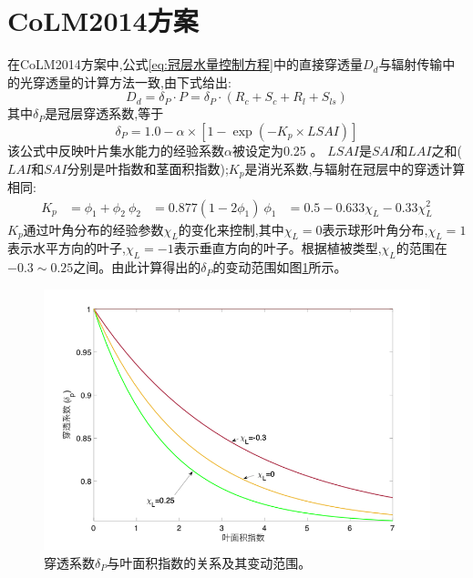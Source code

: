 \section{CoLM2014方案}
在CoLM2014方案中,公式\ref{eq:冠层水量控制方程}中的直接穿透量$D_d$与辐射传输中的光穿透量的计算方法一致,由下式给出:
\begin{equation}
D_{d}=\delta_{P} \cdot P=\delta_{P} \cdot\left(R_{c}+S_{c}+R_{l}+S_{l s}\right)
\end{equation}
其中$\delta_P$是冠层穿透系数,等于
\begin{equation}
\delta_{P}=1.0-\alpha \times\left[1-\exp \left(-K_{p} \times LSAI\right)\right]
\end{equation}
该公式中反映叶片集水能力的经验系数$\alpha$被设定为0.25 \citep{lawrence2011parameterization}。
$LSAI$是$SAI$和$LAI$之和($LAI$和$SAI$分别是叶指数和茎面积指数);$K_p$是消光系数,与辐射在冠层中的穿透计算相同:
\begin{equation}\label{eq:消光系数}
\begin{aligned}
K_{p} &= \phi_{1}+\phi_{2} \
\phi_{2} &= 0.877\left(1-2 \phi_{1}\right) \
\phi_{1} &= 0.5-0.633 \chi_{L}-0.33 \chi_{L}^{2}
\end{aligned}
\end{equation}
$K_p$通过叶角分布的经验参数$\chi_L$的变化来控制,其中$\chi_L=0$表示球形叶角分布,$\chi_L= 1$表示水平方向的叶子,$\chi_L= -1$表示垂直方向的叶子。根据植被类型,$\chi_L$的范围在$-0.3\sim0.25$之间。由此计算得出的$\delta_P$的变动范围如图\ref{fig:穿透系数与叶面积指数}所示。
\begin{figure}[htbp]
\centering
\includegraphics{Figures/陆地表面的水分循环/穿透系数与叶面积指数.png}
\caption{穿透系数$\delta_P$与叶面积指数的关系及其变动范围。}
\label{fig:穿透系数与叶面积指数}
\end{figure}

